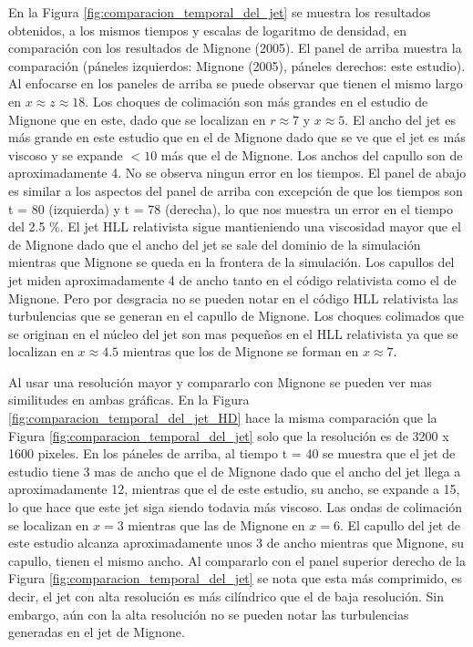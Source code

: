 \documentclass[12pt,a4paper]{book}
\begin{document}
En la Figura \ref{fig:comparacion_temporal_del_jet} se muestra los resultados obtenidos, a 
los mismos tiempos y escalas de logaritmo de densidad, en comparación con los resultados de Mignone (2005). 
El panel de arriba muestra la comparación (páneles izquierdos: Mignone (2005), páneles derechos: 
este estudio). 
Al enfocarse en los paneles de arriba se puede observar que tienen el mismo largo en 
$x \approx z \approx 18$. Los choques de colimación son más grandes en el estudio de Mignone que en este, 
dado que se localizan en $r \approx 7$ y $x \approx 5$. El ancho del jet es más grande en este 
estudio que en el de Mignone dado que se ve que el jet es más viscoso y se expande $<10$ más que el de 
Mignone. Los anchos del capullo son de aproximadamente 4. No se observa ningun error en los tiempos. 
El panel de abajo es similar a los aspectos del panel de arriba con excepción de que los tiempos 
son t = 80 (izquierda) y  t = 78 (derecha), lo que nos muestra un error en el tiempo del 2.5 \%.
El jet HLL relativista sigue mantieniendo una viscosidad 
mayor que el de Mignone dado que el ancho del jet se sale del dominio de la simulación mientras 
que Mignone se queda en la frontera de la simulación. 
Los capullos del jet miden aproximadamente 4 de ancho tanto en el código relativista como el de 
Mignone. Pero por desgracia no se pueden notar en el código HLL relativista 
las turbulencias que se generan en el capullo de Mignone. 
Los choques colimados que se originan en el núcleo del jet son 
mas pequeños en el HLL relativista ya que se localizan en $x \approx 4.5$ mientras 
que los de Mignone se forman en $x \approx 7$.




Al usar una resolución mayor y compararlo con Mignone se pueden ver mas similitudes en ambas gráficas. En 
la Figura \ref{fig:comparacion_temporal_del_jet_HD} hace la misma comparación que la Figura 
\ref{fig:comparacion_temporal_del_jet} solo que la resolución es de 3200 x 1600 pixeles. En los páneles
de arriba, al tiempo t = 40 se muestra que el jet de estudio tiene 3 mas de ancho que el de Mignone 
dado que el ancho del jet llega a aproximadamente 12, mientras que el de este estudio, su ancho, 
se expande a 15, lo que hace que este jet siga siendo todavia más viscoso. 
Las ondas de colimación se localizan en $x = 3$ mientras que las de Mignone 
en $x = 6$. El capullo del jet de este estudio alcanza aproximadamente unos 3 de ancho mientras
que Mignone, su capullo, tienen el mismo ancho.
Al compararlo con el panel superior derecho de la Figura 
\ref{fig:comparacion_temporal_del_jet} se nota que esta más comprimido, es decir, el jet con alta resolución
es más cilíndrico que el de baja resolución. Sin embargo, aún con la alta resolución no se pueden notar las 
turbulencias generadas en el jet de Mignone.
\end{document}

